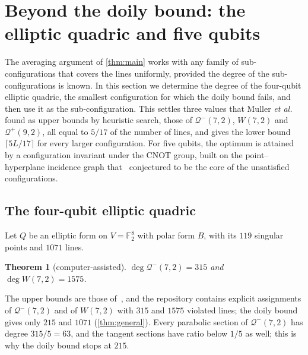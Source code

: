 \documentclass[11pt]{article}
\newtheorem{theorem}{Theorem}
\theoremstyle{definition}
\theoremstyle{remark}
\newcommand{\F}{\mathbb{F}}
\newcommand{\Qp}{\mathcal{Q}^{+}}
\newcommand{\Qm}{\mathcal{Q}^{-}}
\newcommand{\dg}{\operatorname{deg}}
\begin{document}
\section{Beyond the doily bound: the elliptic quadric and five qubits}\label{sec:beyond}

The averaging argument of \cref{thm:main} works with any family of sub-configurations that covers the lines uniformly, provided the degree of the sub-configurations is known.
In this section we determine the degree of the four-qubit elliptic quadric, the smallest configuration for which the doily bound fails, and then use it as the sub-configuration.
This settles three values that Muller \emph{et al.}~\cite{Muller24} found as upper bounds by heuristic search, those of $\Qm(7,2)$, $W(7,2)$ and $\Qp(9,2)$, all equal to $5/17$ of the number of lines, and gives the lower bound $\lceil 5L/17\rceil$ for every larger configuration.
For five qubits, the optimum is attained by a configuration invariant under the CNOT group, built on the point--hyperplane incidence graph that~\cite{Muller24} conjectured to be the core of the unsatisfied configurations.

\subsection{The four-qubit elliptic quadric}

Let $Q$ be an elliptic form on $V=\F_2^8$ with polar form $B$, with its $119$ singular points and $1071$ lines.

\begin{theorem}[computer-assisted]\label{thm:elliptic}
$\dg\Qm(7,2)=315$ and $\dg W(7,2)=1575$.
\end{theorem}

The upper bounds are those of~\cite{Muller24}, and the repository contains explicit assignments of $\Qm(7,2)$ and of $W(7,2)$ with $315$ and $1575$ violated lines; the doily bound gives only $215$ and $1071$ (\cref{thm:general}).
Every parabolic section of $\Qm(7,2)$ has degree $315/5=63$, and the tangent sections have ratio below $1/5$ as well; this is why the doily bound stops at $215$.
\end{document}
